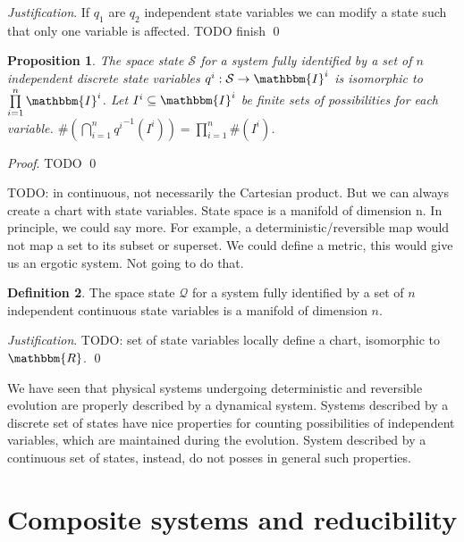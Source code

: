 \documentclass[aps,pra,10pt,twocolumn,floatfix,nofootinbib]{revtex4-1}
\newtheorem{prop}{Proposition}[section]
\theoremstyle{definition}
\newtheorem{defn}[prop]{Definition}
\newenvironment{justification}{\emph{Justification}.}{\qed}
\renewenvironment{proof}{\emph{Proof}.}{\qed}
\begin{document}
\begin{justification}
If $q_1$ are $q_2$ independent state variables we can modify a state such that only one variable is affected. TODO finish
\end{justification}

\begin{prop}\label{discrete_state_space}
The space state $\mathcal{S}$ for a system fully identified by a set of $n$ independent discrete state variables $q^i : \mathcal{S} \rightarrow \mathbbm{I}^i$ is isomorphic to $\prod\limits_{i=1}^n\mathbbm{I}^i$. Let $I^i \subseteq \mathbbm{I}^i$ be finite sets of possibilities for each variable. $\#(\bigcap\limits_{i=1}^{n}{q^i}^{-1}(I^i))=\prod\limits_{i=1}^{n}\#(I^i)$.
\end{prop}

\begin{proof}
TODO
\end{proof}

TODO: in continuous, not necessarily the Cartesian product. But we can always create a chart with state variables. State space is a manifold of dimension n. In principle, we could say more. For example, a deterministic/reversible map would not map a set to its subset or superset. We could define a metric, this would give us an ergotic system. Not going to do that.

\begin{defn}\label{continuous_state_space}
The space state $\mathcal{Q}$ for a system fully identified by a set of $n$ independent continuous state variables is a manifold of dimension $n$.
\end{defn}

\begin{justification}
TODO: set of state variables locally define a chart, isomorphic to $\mathbbm{R}$.
\end{justification}

We have seen that physical systems undergoing deterministic and reversible evolution are properly described by a dynamical system. Systems described by a discrete set of states have nice properties for counting possibilities of independent variables, which are maintained during the evolution. System described by a continuous set of states, instead, do not posses in general such properties.

\section{Composite systems and reducibility}
\end{document}
